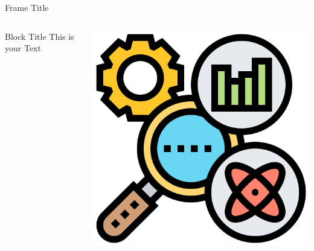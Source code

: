 \documentclass[aspectratio=169,mathserif]{beamer}
\begin{document}
\begin{frame}{Frame Title}
\begin{columns}[c] %
\begin{block}{Block Title}
This is your Text
\end{block}
\pause %
\includegraphics[scale =0.2]{figs/research1.png}
\end{columns}
\end{frame}
\end{document}
